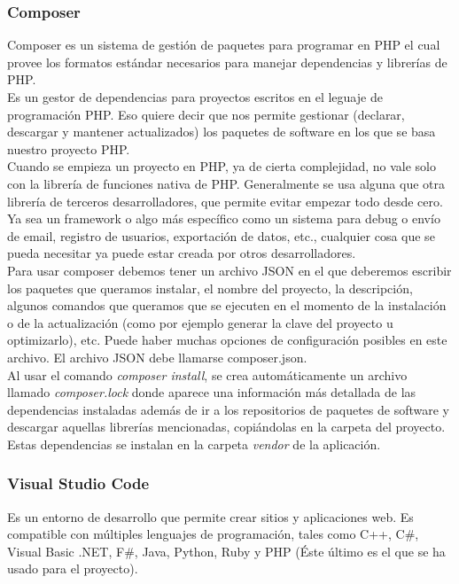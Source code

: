 \subsubsection{Composer}
Composer es un sistema de gestión de paquetes para programar en PHP el cual provee los formatos estándar necesarios para manejar dependencias y librerías de PHP. \cite{Composer:definicion}\\
Es un gestor de dependencias para proyectos escritos en el leguaje de programación PHP. Eso quiere decir que nos permite gestionar (declarar, descargar y mantener actualizados) los paquetes de software en los que se basa nuestro proyecto PHP.\\
Cuando se empieza un proyecto en PHP, ya de cierta complejidad, no  vale solo con la librería de funciones nativa de PHP. Generalmente se usa alguna que otra librería de terceros desarrolladores, que permite evitar empezar todo desde cero. Ya sea un framework o algo más específico como un sistema para debug o envío de email, registro de usuarios, exportación de datos, etc., cualquier cosa que se pueda necesitar ya puede estar creada por otros desarrolladores.\\
Para usar composer debemos tener un archivo JSON en el que deberemos escribir los paquetes que queramos instalar, el nombre del proyecto, la descripción, algunos comandos que queramos que se ejecuten en el momento de la instalación o de la actualización (como por ejemplo generar la clave del proyecto u optimizarlo), etc. Puede haber muchas opciones de configuración posibles en este archivo. 
El archivo JSON debe llamarse composer.json.\\
Al usar el comando \textit{composer install}, se crea automáticamente un archivo llamado \textit{composer.lock} donde aparece una información más detallada de las dependencias instaladas además de ir a los repositorios de paquetes de software y descargar aquellas librerías mencionadas, copiándolas en la carpeta del proyecto.\\
Estas dependencias se instalan en la carpeta \textit{vendor} de la aplicación.\cite{composer}
\subsubsection{Visual Studio Code}
Es un entorno de desarrollo que permite crear sitios y aplicaciones web. Es compatible con múltiples lenguajes de programación, tales como C++, C\#, Visual Basic .NET, F\#, Java, Python, Ruby y PHP (Éste último es el que se ha usado para el proyecto).\cite{VisualStudio} 

